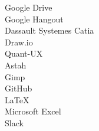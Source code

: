 \begin{description}
    \item[Google Drive]
    \item[Google Hangout]
    \item[Dassault Systemes Catia]
    \item[Draw.io]
    \item[Quant-UX]
    \item[Astah]
    \item[Gimp]
    \item[GitHub]
    \item[LaTeX]
    \item[Microsoft Excel]
    \item[Slack]
\end{description}
